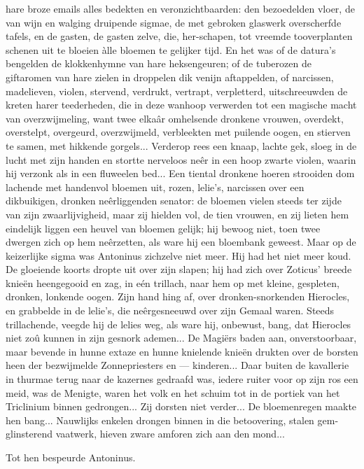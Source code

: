 \documentclass[a4paper, 12pt, oneside, dutch]{article}
\begin{document}
hare broze emails alles bedekten en veronzichtbaarden: den bezoedelden vloer, de van wijn en walging druipende sigmae, de met gebroken glaswerk overscherfde tafels, en de gasten, de gasten zelve, die, her-schapen, tot vreemde tooverplanten schenen uit te bloeien àlle bloemen te gelijker tijd. En het was of de datura's bengelden de klokkenhymne van hare heksengeuren; of de tuberozen de giftaromen van hare zielen in droppelen dik venijn aftappelden, of narcissen, madelieven, violen, stervend, verdrukt, vertrapt, verpletterd, uitschreeuwden de kreten harer teederheden, die in deze wanhoop verwerden tot een magische macht van overzwijmeling, want twee elkaâr omhelsende dronkene vrouwen, overdekt, overstelpt, overgeurd, overzwijmeld, verbleekten met puilende oogen, en stierven te samen, met hikkende gorgels... Verderop rees een knaap, lachte gek, sloeg in de lucht met zijn handen en stortte nerveloos neêr in een hoop zwarte violen, waarin hij verzonk als in een fluweelen bed... Een tiental dronkene hoeren strooiden dom lachende met handenvol bloemen uit, rozen, lelie's, narcissen over een dikbuikigen, dronken neêrliggenden senator: de bloemen vielen steeds ter zijde van zijn zwaarlijvigheid, maar zij hielden vol, de tien vrouwen, en zij lieten hem eindelijk liggen een heuvel van bloemen gelijk; hij bewoog niet, toen twee dwergen zich op hem neêrzetten, als ware hij een bloembank geweest. Maar op de keizerlijke sigma was Antoninus zichzelve niet meer. Hij had het niet meer koud. De gloeiende koorts dropte uit over zijn slapen; hij had zich over Zoticus' breede knieën heengegooid en zag, in eén trillach, naar hem op met kleine, gespleten, dronken, lonkende oogen. Zijn hand hing af, over dronken-snorkenden Hierocles, en grabbelde in de lelie's, die neêrgesneeuwd over zijn Gemaal waren. Steeds trillachende, veegde hij de lelies weg, als ware hij, onbewust, bang, dat Hierocles niet zoû kunnen in zijn gesnork ademen... De Magiërs baden aan, onverstoorbaar, maar bevende in hunne extaze en hunne knielende knieën drukten over de borsten heen der bezwijmelde Zonnepriesters en --- kinderen... Daar buiten de kavallerie in thurmae terug naar de kazernes gedraafd was, iedere ruiter voor op zijn ros een meid, was de Menigte, waren het volk en het schuim tot in de portiek van het Triclinium binnen gedrongen... Zij dorsten niet verder... De bloemenregen maakte hen bang... Nauwlijks enkelen drongen binnen in die betoovering, stalen gem-glinsterend vaatwerk, hieven zware amforen zich aan den mond...

Tot hen bespeurde Antoninus.
\end{document}
